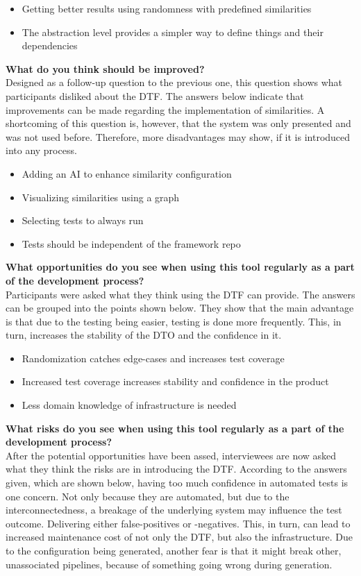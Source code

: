 \begin{itemize}
    \item Getting better results using randomness with predefined similarities
    \item The abstraction level provides a simpler way to define things and their dependencies
\end{itemize}

\textbf{What do you think should be improved?}\\
Designed as a follow-up question to the previous one, this question shows what participants disliked about the DTF.
The answers below indicate that improvements can be made regarding the implementation of similarities.
A shortcoming of this question is, however, that the system was only presented and was not used before.
Therefore, more disadvantages may show, if it is introduced into any process.

\begin{itemize}
    \item Adding an AI to enhance similarity configuration
    \item Visualizing similarities using a graph
    \item Selecting tests to always run
    \item Tests should be independent of the framework repo
\end{itemize}

\textbf{What opportunities do you see when using this tool regularly as a part of the development process?}\\
Participants were asked what they think using the DTF can provide.
The answers can be grouped into the points shown below.
They show that the main advantage is that due to the testing being easier, testing is done more frequently.
This, in turn, increases the stability of the DTO and the confidence in it.

\begin{itemize}
    \item Randomization catches edge-cases and increases test coverage
    \item Increased test coverage increases stability and confidence in the product
    \item Less domain knowledge of infrastructure is needed
\end{itemize}

\textbf{What risks do you see when using this tool regularly as a part of the development process?}\\
After the potential opportunities have been assed, interviewees are now asked what they think the risks are in introducing the DTF.
According to the answers given, which are shown below, having too much confidence in automated tests is one concern.
Not only because they are automated, but due to the interconnectedness, a breakage of the underlying system may influence the test outcome.
Delivering either false-positives or -negatives.
This, in turn, can lead to increased maintenance cost of not only the DTF, but also the infrastructure.
Due to the configuration being generated, another fear is that it might break other, unassociated pipelines, because of something going wrong during generation.


